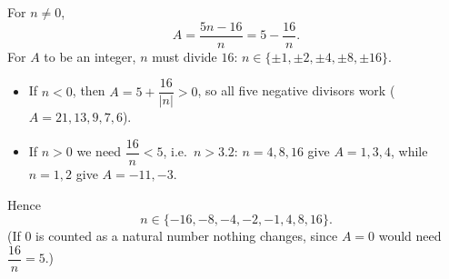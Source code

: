 For $n\ne0$,
\[
A=\dfrac{5n-16}{n}=5-\dfrac{16}{n}.
\]
For $A$ to be an integer, $n$ must divide $16$: $n\in\{\pm1,\pm2,\pm4,\pm8,\pm16\}$.
\begin{itemize}
\item If $n<0$, then $A=5+\dfrac{16}{|n|}>0$, so all five negative divisors work ($A=21,13,9,7,6$).
\item If $n>0$ we need $\dfrac{16}{n}<5$, i.e.\ $n>3.2$: $n=4,8,16$ give $A=1,3,4$, while $n=1,2$ give $A=-11,-3$.
\end{itemize}
Hence
\[
n\in\boxed{\{-16,-8,-4,-2,-1,4,8,16\}} .
\]
(If $0$ is counted as a natural number nothing changes, since $A=0$ would need $\dfrac{16}{n}=5$.)

